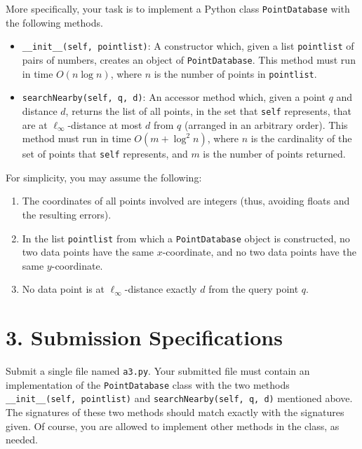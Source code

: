 \documentclass{article}
\begin{document}
More specifically, your task is to implement a Python class \texttt{PointDatabase} with the following methods.

\begin{itemize}
    \item \texttt{\_\_init\_\_(self, pointlist)}: A constructor which, given a list \texttt{pointlist} of pairs of numbers, creates an object of \texttt{PointDatabase}. This method must run in time $O(n \log n)$, where $n$ is the number of points in \texttt{pointlist}.
    
    \item \texttt{searchNearby(self, q, d)}: An accessor method which, given a point $q$ and distance $d$, returns the list of all points, in the set that \texttt{self} represents, that are at $\ell_\infty$-distance at most $d$ from $q$ (arranged in an arbitrary order). This method must run in time $O(m + \log^2 n)$, where $n$ is the cardinality of the set of points that \texttt{self} represents, and $m$ is the number of points returned.
\end{itemize}

For simplicity, you may assume the following:

\begin{enumerate}
    \item The coordinates of all points involved are integers (thus, avoiding floats and the resulting errors).
    
    \item In the list \texttt{pointlist} from which a \texttt{PointDatabase} object is constructed, no two data points have the same $x$-coordinate, and no two data points have the same $y$-coordinate.
    
    \item No data point is at $\ell_\infty$-distance exactly $d$ from the query point $q$.
\end{enumerate}

\section*{3. Submission Specifications}

Submit a single file named \texttt{a3.py}. Your submitted file must contain an implementation of the \texttt{PointDatabase} class with the two methods \texttt{\_\_init\_\_(self, pointlist)} and \texttt{searchNearby(self, q, d)} mentioned above. The signatures of these two methods should match exactly with the signatures given. Of course, you are allowed to implement other methods in the class, as needed.
\end{document}
